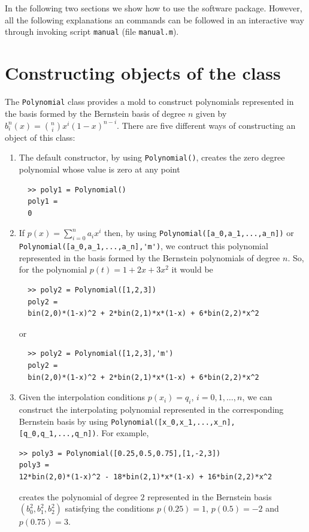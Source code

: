 \documentclass[a4paper,10pt]{report}
\begin{document}
In the following two sections we show how to use the software package. However, all the following explanations
an commands can be followed in an interactive way through invoking script \verb"manual" (file \verb"manual.m").

\section{Constructing objects of the class}

The \verb"Polynomial" class provides a mold to construct polynomials represented in the basis formed by the Bernstein basis
of degree $n$ given by $b_i^n(x)={n\choose i}x^i(1-x)^{n-i}$. There are five different ways of constructing an object of this class:
\begin{enumerate}
 \item The default constructor, by using \verb"Polynomial()", creates the zero degree polynomial whose value is zero at any point
  \begin{verbatim}
  >> poly1 = Polynomial()
  poly1 = 
  0 
  \end{verbatim}
 \item If $p(x)=\sum_{i=0}^n a_i x^i$ then, by using \verb"Polynomial([a_0,a_1,...,a_n])" or \verb"Polynomial([a_0,a_1,...,a_n],'m')",
  we contruct this polynomial represented in the basis formed by the Bernstein polynomials of degree $n$. So, for the polynomial
  $p(t)=1+2x+3x^2$ it would be
  \begin{verbatim}
  >> poly2 = Polynomial([1,2,3])
  poly2 = 
  bin(2,0)*(1-x)^2 + 2*bin(2,1)*x*(1-x) + 6*bin(2,2)*x^2
  \end{verbatim}
  or
  \begin{verbatim}
  >> poly2 = Polynomial([1,2,3],'m')
  poly2 = 
  bin(2,0)*(1-x)^2 + 2*bin(2,1)*x*(1-x) + 6*bin(2,2)*x^2
  \end{verbatim}  
  \item Given the interpolation conditions $p(x_i)=q_i$, $i=0,1,\ldots,n$, we can construct the interpolating polynomial
  represented in the corresponding Bernstein basis by using \verb"Polynomial([x_0,x_1,...,x_n],[q_0,q_1,...,q_n])". For
  example,
  \begin{verbatim}
>> poly3 = Polynomial([0.25,0.5,0.75],[1,-2,3])
poly3 = 
12*bin(2,0)*(1-x)^2 - 18*bin(2,1)*x*(1-x) + 16*bin(2,2)*x^2
\end{verbatim}   
  creates the polynomial of degree $2$ represented in the Bernstein basis $(b_0^2,b_1^2,b_2^2)$
  satisfying the conditions $p(0.25)=1$, $p(0.5)=-2$ and $p(0.75)=3$.

\end{enumerate}
\end{document}
